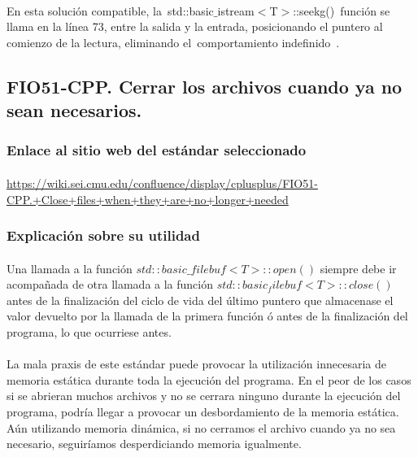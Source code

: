 			\paragraph{}En esta solución compatible, la std::basic$\_$istream$<$T$>$::seekg() función se llama en la línea 73,  entre la salida y la entrada,  posicionando el puntero al comienzo de la lectura, eliminando el comportamiento indefinido .
		
	\subsection{FIO51-CPP. Cerrar los archivos cuando ya no sean necesarios.}
	
		\subsubsection{Enlace al sitio web del estándar seleccionado}
	
			\paragraph{}\url{https://wiki.sei.cmu.edu/confluence/display/cplusplus/FIO51-CPP.+Close+files+when+they+are+no+longer+needed}
	
		\subsubsection{Explicación sobre su utilidad}
	
			\paragraph{}Una llamada a la función $std::basic\_filebuf<T>::open()$ siempre debe ir acompañada de otra llamada a la función $std::basic_filebuf<T>::close()$ antes de la finalización del ciclo de vida del último puntero que almacenase el valor devuelto por la llamada de la primera función ó antes de la finalización del programa, lo que ocurriese antes.
	
			\paragraph{}La mala praxis de este estándar puede provocar la utilización innecesaria de memoria estática durante toda la ejecución del programa. En el peor de los casos si se abrieran muchos archivos y no se cerrara ninguno durante la ejecución del programa, podría llegar a provocar un desbordamiento de la memoria estática. Aún utilizando memoria dinámica, si no cerramos el archivo cuando ya no sea necesario, seguiríamos desperdiciando memoria igualmente.
	
